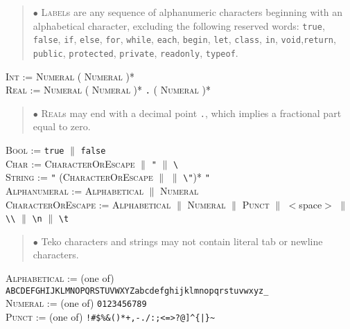 \documentclass{article}
\newcommand{\code}[1]{\colorbox{light-gray}{\texttt{#1}}}
\begin{document}
\begin{quote} $\bullet$ \textsc{Label}s are any sequence of alphanumeric characters beginning with an alphabetical character, excluding the following reserved words: \code{true}, \code{false}, \code{if}, \code{else}, \code{for}, \code{while}, \code{each}, \code{begin}, \code{let}, \code{class}, \code{in}, \code{void},\code{return}, \code{public}, \code{protected}, \code{private}, \code{readonly}, \code{typeof}. \end{quote}

\textsc{Int} := \textsc{Numeral} ( \textsc{Numeral} )* \\

\textsc{Real} := \textsc{Numeral} ( \textsc{Numeral} )* \code{.} ( \textsc{Numeral} )* 

\begin{quote} $\bullet$ \textsc{Real}s may end with a decimal point \code{.}, which implies a fractional part equal to zero. \end{quote}

\textsc{Bool} := \code{true} $\|$ \code{false} \\

\textsc{Char} := \code{} \textsc{CharacterOrEscape} \code{} $\|$ \code{\char13"} $\|$ \code{\char13\textbackslash\char13\char13} \\

\textsc{String} := \code{"} (\textsc{CharacterOrEscape} $\|$ \code{} $\|$ \code{\textbackslash"})* \code{"} \\

\textsc{Alphanumeral} := \textsc{Alphabetical} $\|$ \textsc{Numeral} \\

\textsc{CharacterOrEscape} := \textsc{Alphabetical} $\|$ \textsc{Numeral} $\|$ \textsc{Punct} $\|$ $<$space$>$ $\|$ \code{\textbackslash\textbackslash} $\|$ \code{\textbackslash n} $\|$ \code{\textbackslash t} 

\begin{quote} $\bullet$ Teko characters and strings may not contain literal tab or newline characters. \end{quote}

\textsc{Alphabetical} := (one of) \code{ABCDEFGHIJKLMNOPQRSTUVWXYZabcdefghijklmnopqrstuvwxyz\_} \\

\textsc{Numeral} := (one of) \code{0123456789} \\

\textsc{Punct} := (one of) \code{!\#\$\%\&()*+,-./:;<=>?@]\^{}\{|\}\~} \\
\end{document}
